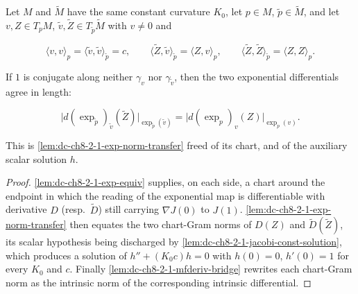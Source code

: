 \begin{lemma}
  \label{lem:dc-ch8-2-1-exp-norm-transfer-mfderiv}
  \leanok
  Let $M$ and $\tilde M$ have the same constant curvature $K_0$, let $p\in M$, $\tilde p\in\tilde M$,
  and let $v,Z\in T_pM$, $\tilde v,\tilde Z\in T_{\tilde p}\tilde M$ with $v\neq 0$ and

  $$
  \langle v,v\rangle_p=\langle\tilde v,\tilde v\rangle_{\tilde p}=c,\qquad
  \langle \tilde Z,\tilde v\rangle_{\tilde p}=\langle Z,v\rangle_p,\qquad
  \langle \tilde Z,\tilde Z\rangle_{\tilde p}=\langle Z,Z\rangle_p .
  $$

  If $1$ is conjugate along neither $\gamma_v$ nor $\gamma_{\tilde v}$, then the two exponential
  differentials agree in length:

  $$
  \big|d(\exp_{\tilde p})_{\tilde v}(\tilde Z)\big|_{\exp_{\tilde p}(\tilde v)}
  =\big|d(\exp_p)_v(Z)\big|_{\exp_p(v)} .
  $$

  This is \cref{lem:dc-ch8-2-1-exp-norm-transfer} freed of its chart, and of the auxiliary scalar
  solution $h$.
\end{lemma}
\begin{proof}
  \leanok
\sketch
  \cref{lem:dc-ch8-2-1-exp-equiv} supplies, on each side, a chart around the endpoint in which the
  reading of the exponential map is differentiable with derivative $D$ (resp.\ $\tilde D$) still
  carrying $\nabla J(0)$ to $J(1)$. \cref{lem:dc-ch8-2-1-exp-norm-transfer} then equates the two
  chart-Gram norms of $D(Z)$ and $\tilde D(\tilde Z)$, its scalar hypothesis being discharged by
  \cref{lem:dc-ch8-2-1-jacobi-const-solution}, which produces a solution of $h''+(K_0c)h=0$ with
  $h(0)=0$, $h'(0)=1$ for every $K_0$ and $c$. Finally
  \cref{lem:dc-ch8-2-1-mfderiv-bridge} rewrites each chart-Gram norm as the intrinsic norm of the
  corresponding intrinsic differential.
\end{proof}

